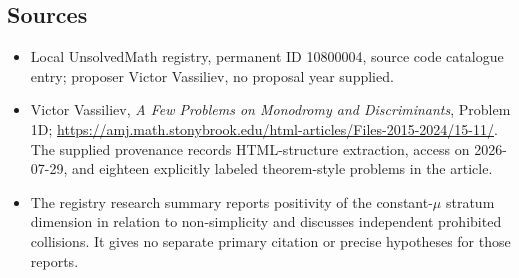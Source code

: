 \documentclass[11pt]{article}
\begin{document}
\subsection{Sources}
\begin{itemize}
\item Local UnsolvedMath registry, permanent ID 10800004, source code catalogue entry; proposer Victor Vassiliev, no proposal year supplied.
\item Victor Vassiliev, \emph{A Few Problems on Monodromy and Discriminants}, Problem 1D; \url{https://amj.math.stonybrook.edu/html-articles/Files-2015-2024/15-11/}. The supplied provenance records HTML-structure extraction, access on 2026-07-29, and eighteen explicitly labeled theorem-style problems in the article.
\item The registry research summary reports positivity of the constant-$\mu$ stratum dimension in relation to non-simplicity and discusses independent prohibited collisions. It gives no separate primary citation or precise hypotheses for those reports.
\end{itemize}
\end{document}
